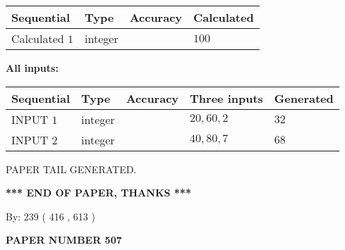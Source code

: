 \documentclass{ctexart}
\begin{document}
   
   
   
\noindent{}
   
   
  
  
\noindent\begin{tabular}{|l|l|l|l|}
\hline
 Sequential & Type & Accuracy & Calculated \\ 
\hline
 
 
  Calculated $  1 $ & integer &  & 
  $ 100 $ 
 \\  \hline  
 \end{tabular}
   
   
   
   
\noindent\vspace{0.1in}\hspace{-0.08in} {\textbf{\Large{All inputs: }}}
   
   
  
  
\noindent\begin{tabular}{|l|l|l|l|l|}
\hline
 Sequential & Type & Accuracy & Three inputs & Generated \\ 
\hline
 
 
  INPUT $  1 $ & integer &  & $
 20
 , 
 60
 , 
 2
 $ & $ 32 $ 
 \\  \hline  
 
 
  INPUT $  2 $ & integer &  & $
 40
 , 
 80
 , 
 7
 $ & $ 68 $ 
 \\  \hline  
 \end{tabular}
   
   
   
   
   
   
 \vspace{0.2in}
 
   
   
\vspace{2.0in} PAPER TAIL GENERATED.
   
   
   
   
\vspace{1.0in} 
{\textbf{\large{ *** END OF PAPER, THANKS *** }}} 
   
   
\hspace{1.0in} By: 
 239 ( 416 ,  613 )
   
   
   
   
\newpage 
\setcounter{page}{ 
   507001 } 
   
   
   
   
 {\textbf{ \Large{ PAPER NUMBER  507  }}}
   
\end{document}
